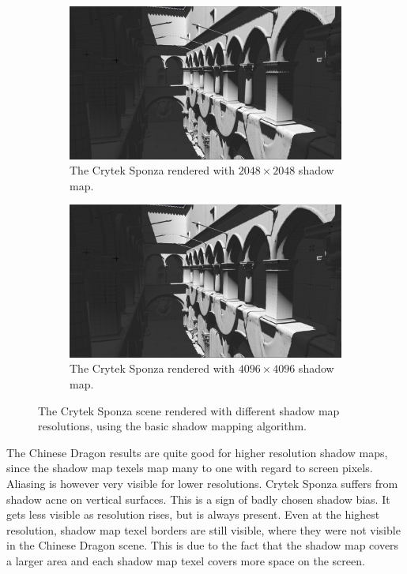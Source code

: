 \begin{figure}[t]
    \begin{subfigure}{0.48\textwidth}
		\centering
        \includegraphics[width=\textwidth]{./graf/tests/basic/cropped/sponza_basic_fhd_2048.png}
        \caption{The Crytek Sponza rendered with \(2048\times 2048\) shadow map.}
    \end{subfigure}
	\hfill
    \begin{subfigure}{0.48\textwidth}
		\centering
        \includegraphics[width=\textwidth]{./graf/tests/basic/cropped/sponza_basic_fhd_4096.png}
        \caption{The Crytek Sponza rendered with \(4096\times 4096\) shadow map.}
    \end{subfigure}

    \caption{The Crytek Sponza scene rendered with different shadow map resolutions, using the basic shadow mapping algorithm.}
    \label{fig:test_basic_sponza_screens}
\end{figure}

The Chinese Dragon results are quite good for higher resolution shadow maps, since the shadow map texels map many to one with regard to screen pixels. Aliasing is however very visible for lower resolutions. Crytek Sponza suffers from shadow acne on vertical surfaces. This is a sign of badly chosen shadow bias. It gets less visible as resolution rises, but is always present. Even at the highest resolution, shadow map texel borders are still visible, where they were not visible in the Chinese Dragon scene. This is due to the fact that the shadow map covers a larger area and each shadow map texel covers more space on the screen.

